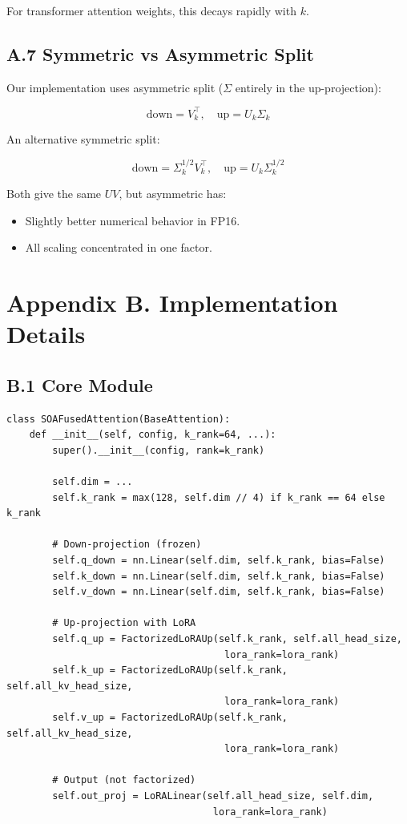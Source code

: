 For transformer attention weights, this decays rapidly with $k$.

\subsection{A.7 Symmetric vs Asymmetric Split}

Our implementation uses asymmetric split ($\Sigma$ entirely in the up-projection):

\[
\text{down} = V_k^\top, \quad \text{up} = U_k \Sigma_k
\]

An alternative symmetric split:

\[
\text{down} = \Sigma_k^{1/2} V_k^\top, \quad \text{up} = U_k \Sigma_k^{1/2}
\]

Both give the same $UV$, but asymmetric has:
\begin{itemize}
\item Slightly better numerical behavior in FP16.
\item All scaling concentrated in one factor.

\end{itemize}


\section{Appendix B. Implementation Details}

\subsection{B.1 Core Module}

\begin{lstlisting}
class SOAFusedAttention(BaseAttention):
    def __init__(self, config, k_rank=64, ...):
        super().__init__(config, rank=k_rank)
        
        self.dim = ...
        self.k_rank = max(128, self.dim // 4) if k_rank == 64 else k_rank
        
        # Down-projection (frozen)
        self.q_down = nn.Linear(self.dim, self.k_rank, bias=False)
        self.k_down = nn.Linear(self.dim, self.k_rank, bias=False)
        self.v_down = nn.Linear(self.dim, self.k_rank, bias=False)
        
        # Up-projection with LoRA
        self.q_up = FactorizedLoRAUp(self.k_rank, self.all_head_size, 
                                      lora_rank=lora_rank)
        self.k_up = FactorizedLoRAUp(self.k_rank, self.all_kv_head_size, 
                                      lora_rank=lora_rank)
        self.v_up = FactorizedLoRAUp(self.k_rank, self.all_kv_head_size, 
                                      lora_rank=lora_rank)
        
        # Output (not factorized)
        self.out_proj = LoRALinear(self.all_head_size, self.dim, 
                                    lora_rank=lora_rank)
\end{lstlisting}

